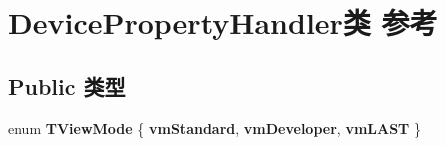 \hypertarget{class_device_property_handler}{\section{Device\+Property\+Handler类 参考}
\label{class_device_property_handler}
}
\subsection*{Public 类型}
\begin{DoxyCompactItemize}
\item 
\hypertarget{class_device_property_handler_a9799f6629293d5cb55aed1d686f34178}{enum {\bfseries T\+View\+Mode} \{ {\bfseries vm\+Standard}, 
{\bfseries vm\+Developer}, 
{\bfseries vm\+L\+A\+S\+T}
 \}}\label{class_device_property_handler_a9799f6629293d5cb55aed1d686f34178}

\end{DoxyCompactItemize}
